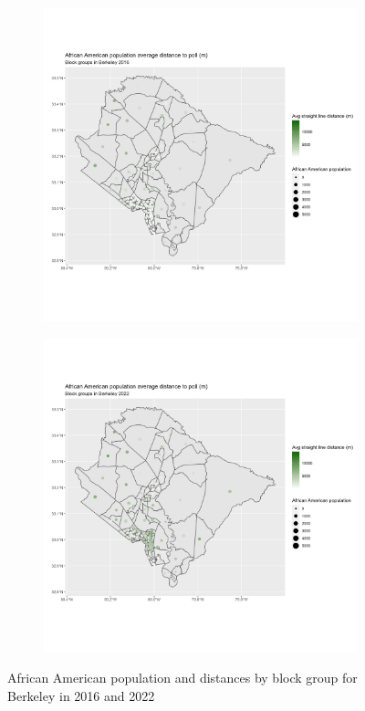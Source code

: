 \documentclass[11pt]{article}
\theoremstyle{remark}
\theoremstyle{definition}
\begin{document}
\begin{figure}
	\begin{subfigure}{.5\textwidth}
		\centering
		\includegraphics[width=\linewidth]{result_analysis/Berkeley_County_SC_original_configs/black_pop_and_dist_Berkeley_config_original_2016_polls.png}
		\label{sfig:York_2016_bg_dist_pop}
	\end{subfigure} 
	\begin{subfigure}{.5\textwidth}
		\centering
		\includegraphics[width=\linewidth]{result_analysis/Berkeley_County_SC_original_configs/black_pop_and_dist_Berkeley_config_original_2022_polls.png}
		\label{sfig:Berkeley_2022_bg_dist}
	\end{subfigure}
	\caption{African American population and distances by block group for Berkeley in 2016 and 2022}
	\label{fig:Berkeley distance Black population maps}
\end{figure}
\end{document}
